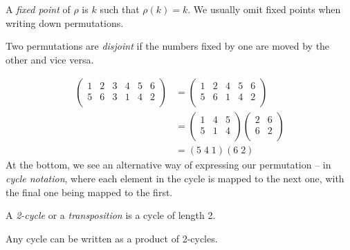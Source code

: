 \documentclass{../../template/note}
\begin{document}
    \begin{definition}
        A \emph{fixed point} of \(\rho\) is \(k\) such that \(\rho(k) = k\). We usually omit fixed points when writing down permutations.
    \end{definition}
    
    \begin{definition}
        Two permutations are \emph{disjoint} if the numbers fixed by one are moved by the other and vice versa.
    \end{definition}
    
    \begin{example}
        \begin{align*}
            \begin{pmatrix}
             1 & 2 & 3 & 4 & 5 & 6 \\
             5 & 6 & 3 & 1 & 4 & 2\\
            \end{pmatrix} &= 
            \begin{pmatrix}
             1 & 2 & 4 & 5 & 6 \\
             5 & 6 & 1 & 4 & 2\\
            \end{pmatrix} \\
            &= \begin{pmatrix}
             1 & 4 & 5 \\
             5 & 1 & 4 \\
            \end{pmatrix} \begin{pmatrix}
             2 & 6 \\
             6 & 2 \\
            \end{pmatrix} \\
            &= (5\;4\;1)(6\;2)
        \end{align*}
        At the bottom, we see an alternative way of expressing our permutation -- in \emph{cycle notation}, where each element in the cycle is mapped to the next one, with the final one being mapped to the first.        
    \end{example}
    
    \begin{definition}
        A \emph{2-cycle} or a \emph{transposition} is a cycle of length 2.
    \end{definition}
    
    \begin{proposition}
        Any cycle can be written as a product of 2-cycles.
    \end{proposition}
    
\end{document}
